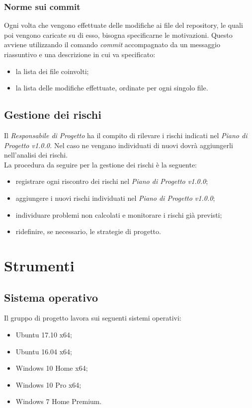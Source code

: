 \documentclass[./../NomeDocumento.tex]{subfiles}
\begin{document}
	\subsubsection{Norme sui commit}
	
	Ogni volta che vengono effettuate delle modifiche ai file del repository, le quali poi vengono caricate su di esso, bisogna specificarne le motivazioni. Questo avviene utilizzando il comando \textit{commit} accompagnato da un messaggio riassuntivo e una descrizione in cui va specificato: 
	\begin{itemize}
		\item la lista dei file coinvolti;
		\item la lista delle modifiche effettuate, ordinate per ogni singolo file.
	\end{itemize}
	\subsection{Gestione dei rischi}
	
	Il \textit{Responsabile di Progetto} ha il compito di rilevare i rischi indicati nel \textit{Piano di Progetto v1.0.0.} Nel caso ne vengano individuati di nuovi dovrà aggiungerli nell'analisi dei rischi. 
	\\ \noindent La procedura da seguire per la gestione dei rischi è la seguente:
	\begin{itemize}
		\item registrare ogni riscontro dei rischi nel \textit{Piano di Progetto v1.0.0};
		\item aggiungere i nuovi rischi individuati nel \textit{Piano di Progetto v1.0.0};
		\item individuare problemi non calcolati e monitorare i rischi già previsti;
		\item ridefinire, se necessario, le strategie di progetto.
	\end{itemize}
	
	\section{Strumenti}
	
	\subsection{Sistema operativo}
	
	Il gruppo di progetto lavora sui seguenti sistemi operativi:
	\begin{itemize}
		\item Ubuntu 17.10 x64;
		\item Ubuntu 16.04  x64;
		\item Windows 10 Home x64;
		\item Windows 10 Pro x64;
		\item Windows 7 Home Premium.
	\end{itemize}
	
\end{document}
